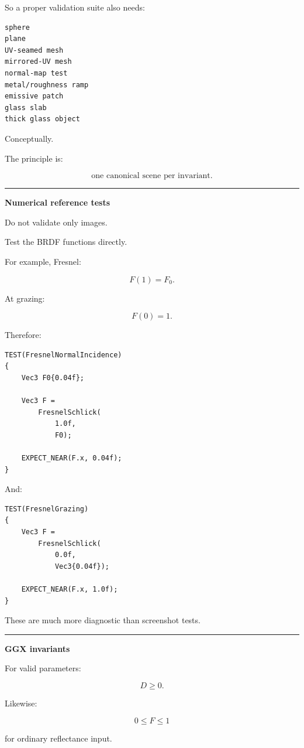 So a proper validation suite also needs:

\begin{verbatim}
sphere
plane
UV-seamed mesh
mirrored-UV mesh
normal-map test
metal/roughness ramp
emissive patch
glass slab
thick glass object
\end{verbatim}

Conceptually.

The principle is:

\[
\boxed{
\text{one canonical scene per invariant}.
}
\]

\begin{center}\rule{0.5\linewidth}{0.5pt}\end{center}

\textbf{Numerical reference tests}

Do not validate only images.

Test the BRDF functions directly.

For example, Fresnel:

\[
F(1)=F_0.
\]

At grazing:

\[
F(0)=1.
\]

Therefore:

\begin{verbatim}
TEST(FresnelNormalIncidence)
{
    Vec3 F0{0.04f};

    Vec3 F =
        FresnelSchlick(
            1.0f,
            F0);

    EXPECT_NEAR(F.x, 0.04f);
}
\end{verbatim}

And:

\begin{verbatim}
TEST(FresnelGrazing)
{
    Vec3 F =
        FresnelSchlick(
            0.0f,
            Vec3{0.04f});

    EXPECT_NEAR(F.x, 1.0f);
}
\end{verbatim}

These are much more diagnostic than screenshot tests.

\begin{center}\rule{0.5\linewidth}{0.5pt}\end{center}

\textbf{GGX invariants}

For valid parameters:

\[
D\ge0.
\]

Likewise:

\[
0\le F\le1
\]

for ordinary reflectance input.

